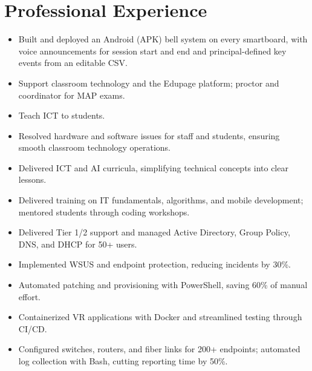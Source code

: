\documentclass[a4paper,10pt]{article}
\begin{document}
\section*{Professional Experience}
\begin{itemize}
  \item Built and deployed an Android (APK) bell system on every smartboard, with voice announcements for session start and end and principal-defined key events from an editable CSV.
  \item Support classroom technology and the Edupage platform; proctor and coordinator for MAP exams.
  \item Teach ICT to students.
\end{itemize}
\begin{itemize}
  \item Resolved hardware and software issues for staff and students, ensuring smooth classroom technology operations.
  \item Delivered ICT and AI curricula, simplifying technical concepts into clear lessons.
\end{itemize}
\begin{itemize}
  \item Delivered training on IT fundamentals, algorithms, and mobile development; mentored students through coding workshops.
\end{itemize}
\begin{itemize}
  \item Delivered Tier 1/2 support and managed Active Directory, Group Policy, DNS, and DHCP for 50+ users.
  \item Implemented WSUS and endpoint protection, reducing incidents by 30\%.
  \item Automated patching and provisioning with PowerShell, saving 60\% of manual effort.
\end{itemize}
\begin{itemize}
  \item Containerized VR applications with Docker and streamlined testing through CI/CD.
\end{itemize}
\begin{itemize}
  \item Configured switches, routers, and fiber links for 200+ endpoints; automated log collection with Bash, cutting reporting time by 50\%.
\end{itemize}
\end{document}
